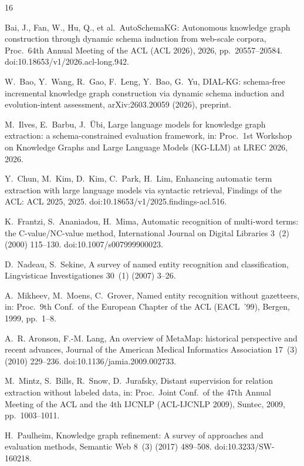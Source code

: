 \documentclass[preprint,12pt]{elsarticle}
\begin{document}
\begin{thebibliography}{16}

 Bai, J., Fan, W., Hu, Q., et al.\ AutoSchemaKG:
Autonomous knowledge graph construction through dynamic schema
induction from web-scale corpora, Proc.\ 64th Annual Meeting of the
ACL (ACL 2026), 2026, pp.\ 20557--20584.
doi:10.18653/v1/2026.acl-long.942.

 W.~Bao, Y.~Wang, R.~Gao, F.~Leng, Y.~Bao, G.~Yu,
DIAL-KG: schema-free incremental knowledge graph construction via
dynamic schema induction and evolution-intent assessment,
arXiv:2603.20059 (2026), preprint.

 M.~Ilves, E.~Barbu, J.~\"Ubi, Large language
models for knowledge graph extraction: a schema-constrained
evaluation framework, in: Proc.\ 1st Workshop on Knowledge Graphs
and Large Language Models (KG-LLM) at LREC 2026, 2026.

 Y.~Chun, M.~Kim, D.~Kim, C.~Park, H.~Lim,
Enhancing automatic term extraction with large language models via
syntactic retrieval, Findings of the ACL: ACL 2025, 2025.
doi:10.18653/v1/2025.findings-acl.516.

 K.~Frantzi, S.~Ananiadou, H.~Mima, Automatic recognition
of multi-word terms: the C-value/NC-value method, International Journal on
Digital Libraries 3~(2) (2000) 115--130. doi:10.1007/s007999900023.

 D.~Nadeau, S.~Sekine, A survey of named entity
recognition and classification, Lingvisticae Investigationes 30~(1)
(2007) 3--26.

 A.~Mikheev, M.~Moens, C.~Grover, Named entity
recognition without gazetteers, in: Proc.\ 9th Conf.\ of the
European Chapter of the ACL (EACL~'99), Bergen, 1999, pp.\ 1--8.

 A.~R. Aronson, F.-M. Lang, An overview of MetaMap:
historical perspective and recent advances, Journal of the American
Medical Informatics Association 17~(3) (2010) 229--236.
doi:10.1136/jamia.2009.002733.

 M.~Mintz, S.~Bills, R.~Snow, D.~Jurafsky, Distant
supervision for relation extraction without labeled data, in: Proc.\
Joint Conf.\ of the 47th Annual Meeting of the ACL and the 4th
IJCNLP (ACL-IJCNLP 2009), Suntec, 2009, pp.\ 1003--1011.

 H.~Paulheim, Knowledge graph refinement: A survey of
approaches and evaluation methods, Semantic Web 8~(3) (2017) 489--508.
doi:10.3233/SW-160218.


\end{thebibliography}
\end{document}
